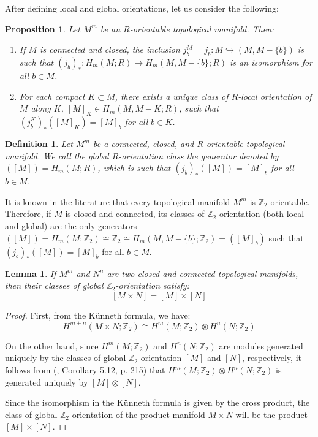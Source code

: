 \documentclass[12pt,oneside]{book}
\newtheorem{defi}   {Definition}[chapter]
\newtheorem{prop}   {Proposition}[chapter]
\newtheorem{lem}    {Lemma}[chapter]
\newcommand{\Z}{\mathbb{Z}}
\begin{document}
    After defining local and global orientations, let us consider the following:
    
    \begin{prop}\label{orient_local}
        Let $M^{m}$ be an $R$-orientable topological manifold. Then:
        \begin{enumerate}
            \item If $M$ is connected and closed, the inclusion $j_{b}^{M} = j_{b}: M \hookrightarrow (M, M-\{b\})$ is such that 
            $(j_{b})_{*}: H_{m}(M; R) \to H_{m}(M, M-\{b\}; R)$ is an isomorphism for all $b \in M$.
            \item For each compact $K \subset M$, there exists a unique class of $R$-local orientation of $M$ along 
            $K$, $[M]_{K} \in H_{m}(M, M-K; R)$, such that $(j_{b}^{K})_{*}([M]_{K}) = [M]_{b}$ for all $b \in K$.
        \end{enumerate}
    \end{prop}
    
    \begin{defi}
        Let $M^{m}$ be a connected, closed, and $R$-orientable topological manifold. We call the global $R$-orientation 
        class the generator denoted by $([M]) = H_{m}(M; R)$, which is such that 
        $(j_{b})_{*}([M]) = [M]_{b}$ for all $b \in M$.
    \end{defi}
    
    It is known in the literature that every topological manifold $M^{m}$ is $\Z_{2}$-orientable. Therefore, if $M$ is closed and connected, 
    its classes of $\Z_{2}$-orientation (both local and global) are the only generators 
    $([M]) = H_{m}(M; \Z_{2}) \cong \Z_{2} \cong H_{m}(M, M-\{b\}; \Z_{2}) = ([M]_{b})$ such that $(j_{b})_{*}([M]) = [M]_{b}$ for all 
    $b \in M$.
    
    \begin{lem}
        If $M^{m}$ and $N^{n}$ are two closed and connected topological manifolds, then their classes of global $\Z_{2}$-orientation satisfy:
        $$ [M \times N] = [M] \times [N] $$
    \end{lem}
    \begin{proof}
        
        First, from the Künneth formula, we have:
        $$ H^{m+n}(M \times N; \Z_{2}) \cong H^{m}(M; \Z_{2}) \otimes H^{n}(N; \Z_{2}) $$
    
        On the other hand, since $H^{m}(M; \Z_{2})$ and $H^{n}(N; \Z_{2})$ are modules generated uniquely by the classes of global 
        $\Z_{2}$-orientation $[M]$ and $[N]$, respectively, it follows from (\cite{hungerford}, Corollary 5.12, p. 215) that 
        $H^{m}(M; \Z_{2}) \otimes H^{n}(N; \Z_{2})$ is generated uniquely by $[M] \otimes [N]$.
        
        Since the isomorphism in the Künneth formula is given by the cross product, the class of global 
        $\Z_{2}$-orientation of the product manifold $M \times N$ will be the product $[M] \times [N]$.
        
    \end{proof}
\end{document}
